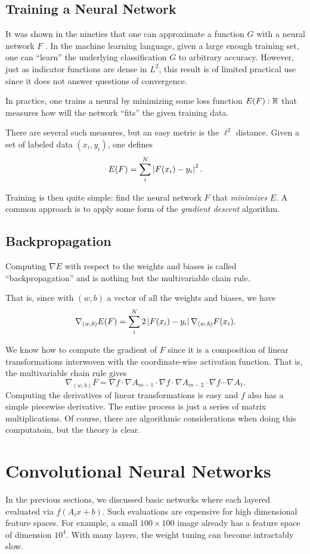 \documentclass[12pt,letterpaper,boxed]{article}
\begin{document}
	\subsection{Training a Neural Network}
	It was shown in the nineties that one can approximate a function $G$ with a neural network $F$ \cite{cybenko1989}. In the machine learning language, given a large enough training set, one can ``learn'' the underlying classification $G$ to arbitrary accuracy. However, just as indicator functions are dense in $L^2$, this result is of limited practical use since it does not answer questions of convergence.

	In practice, one trains a neural by minimizing some loss function $E(F) : {\mathbb{R}}$ that measures how will the network ``fits'' the given training data.

	There are several such measures, but an easy metric is the $\ell^2$ distance. Given a set of labeled data $(x_i, y_i)$, one defines
	\[
		E(F) = \sum_i^N \left| F(x_i) - y_i \right|^2.
	\]

	Training is then quite simple: find the neural network $F$ that \textit{minimizes} $E$. A common approach is to apply some form of the \textit{gradient descent} algorithm.
		\subsection{Backpropagation}
		Computing $\nabla E$ with respect to the weights and biases is called ``backpropagation'' and is nothing but the multivariable chain rule. 

		That is, since with $(w,b)$ a vector of all the weights and biases, we have
		\[
			\nabla_{(w, b)} E(F) = \sum_i^N 2 \left| F(x_i) - y_i \right| \nabla_{(w, b)} F(x_i).
		\]

		We know how to compute the gradient of $F$ since it is a composition of linear transformations interwoven with the coordinate-wise activation function. That is, the multivariable chain rule gives
		\[
			\nabla_{(w, b)} F = \nabla f \cdot \nabla A_{m - 1} \cdot \nabla f \cdot \nabla A_{m - 2} \cdot \nabla f \cdots \nabla A_1. 
		\]
		Computing the derivatives of linear transformations is easy and $f$ also has a simple piecewise derivative. The entire process is just a series of matrix multiplications. Of course, there are algorithmic considerations when doing this computatoin, but the theory is clear.

\section{Convolutional Neural Networks}
In the previous sections, we discussed basic networks where each layered evaluated via $f(A_i x + b)$. Such evaluations are expensive for high dimensional feature spaces. For example, a small $100\times100$ image already has a feature space of dimension $10^4$. With many layers, the weight tuning can become intractably slow. 
\end{document}
